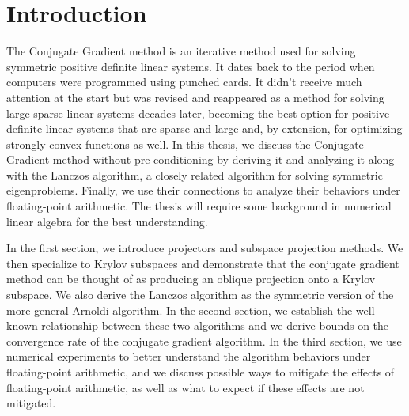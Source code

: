 \documentclass[]{article}
\theoremstyle{definition}
\begin{document}
\section{Introduction}
    The Conjugate Gradient method is an iterative method used for solving symmetric positive definite linear systems. It dates back to the period when computers were programmed using punched cards. It didn't receive much attention at the start but was revised and reappeared as a method for solving large sparse linear systems decades later, becoming the best option for positive definite linear systems that are sparse and large and, by extension, for optimizing strongly convex functions as well. In this thesis, we discuss the Conjugate Gradient method without pre-conditioning by deriving it and analyzing it along with the Lanczos algorithm, a closely related algorithm for solving symmetric eigenproblems. Finally, we use their connections to analyze their behaviors under floating-point arithmetic. The thesis will require some background in numerical linear algebra for the best understanding. 
    \par
    In the first section, we introduce projectors and subspace projection methods.  We then specialize to Krylov subspaces and demonstrate that the conjugate gradient method can be thought of as producing an oblique projection onto a Krylov subspace.  We also derive the Lanczos algorithm as the symmetric version of the more general Arnoldi algorithm.  In the second section, we establish the well-known relationship between these two algorithms and we derive bounds on the convergence rate of the conjugate gradient algorithm.  In the third section, we use numerical experiments to better understand the algorithm behaviors under floating-point arithmetic, and we discuss possible ways to mitigate the effects of floating-point arithmetic, as well as what to expect if these effects are not mitigated.
\end{document}
